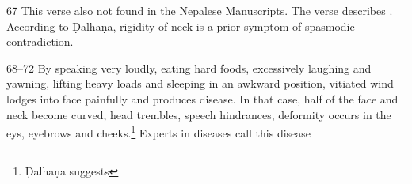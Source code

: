 \begin{translation}
\item[67] This verse also not found in the Nepalese Manuscripts. The verse describes . According to Ḍalhaṇa, rigidity of neck is a prior symptom of spasmodic contradiction. 

\item[68--72] By speaking very loudly, eating hard foods, excessively laughing and yawning, lifting heavy loads and sleeping in an awkward position, vitiated wind lodges into face painfully and produces  disease. In that case, half of the face and neck become curved, head trembles, speech hindrances, deformity occurs in the eys, eyebrows and cheeks.\footnote{Ḍalhaṇa suggests } Experts in diseases call this disease  

\end{translation}